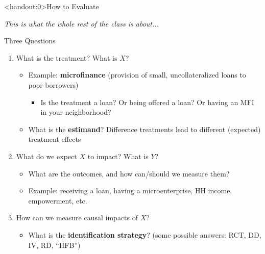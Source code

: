 \documentclass[10pt,xcolor=table,ignorenonframetext,handout,aspectratio=169]{beamer}
\newlength{\wideitemsep}
\let\olditem\item
\renewcommand{\item}{\setlength{\itemsep}{\wideitemsep}\olditem}
\begin{document}

\begin{frame}<handout:0>{How to Evaluate}

\medskip
\emph{This is what the whole rest of the class is about...}


\end{frame}





\begin{frame}{Three Questions}

\medskip
\begin{enumerate}
	
	\item What is the treatment?  What is $X$?
	
	\medskip
	\begin{itemize}
	
	\item Example:  \textbf{microfinance} (provision of small, uncollateralized loans to poor borrowers)
	
		\medskip
		\begin{itemize}
		
		\item Is the treatment a loan?  Or being offered a loan?  Or having an MFI in your neighborhood?
		
		\end{itemize}
	
	\item What is the \textbf{estimand}?  Difference treatments lead to different (expected) treatment effects
	
	\end{itemize}
	
	\pause
	\item What do we expect $X$ to impact?  What is $Y$?
	
	\medskip
	\begin{itemize}
	
	\item What are the outcomes, and how can/should we measure them?
	
	\item Example:  receiving a loan, having a microenterprise, HH income, empowerment, etc.
	
	\end{itemize}
	
	\pause
	\item How can we measure causal impacts of $X$?
	
	\medskip
	\begin{itemize}
		
		\item What is the \textbf{identification strategy}?  (some possible answers:  RCT, DD, IV, RD, ``HFB'')
		
	\end{itemize}
	
\end{enumerate}

\end{frame}
\end{document}
